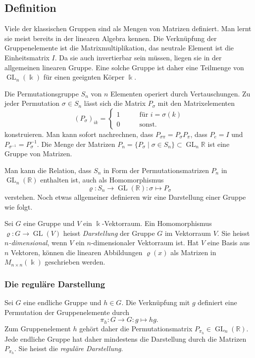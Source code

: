 %
%
%

%
%
\subsection{Definition}
Viele der klassischen Gruppen sind als Mengen von Matrizen definiert.
Man lernt sie meist bereits in der linearen Algebra kennen.
Die Verknüpfung der Gruppenelemente ist die Matrixmultiplikation,
das neutrale Element ist die Einheitsmatrix $I$.
Da sie auch invertierbar sein müssen, liegen sie in der 
allgemeinen linearen Gruppe.
Eine solche Gruppe ist daher eine Teilmenge von $\operatorname{GL}_n(\Bbbk)$
für einen geeignten Körper $\Bbbk$.

Die Permutationsgruppe $S_n$ von $n$ Elementen operiert durch 
Vertauschungen.
Zu jeder Permutation $\sigma\in S_n$ lässt sich die Matrix $P_\sigma$
mit den Matrixelementen
\[
(P_\sigma)_{ik}
=
\begin{cases}
1&\qquad\text{für $i=\sigma(k)$}\\
0&\qquad\text{sonst}.
\end{cases}
\]
konstruieren.
Man kann sofort nachrechnen, dass $P_{\sigma\pi} = P_\sigma P_\pi$,
dass $P_{e}=I$ und $P_{\sigma^{-1}}=P_\sigma^{-1}$.
Die Menge der Matrizen
$P_n=\{P_\sigma\mid\sigma\in S_n\}\subset\operatorname{GL}_n{\mathbb{R}}$
ist eine Gruppe von Matrizen.

Man kann die Relation, dass $S_n$ in Form der Permutationsmatrizen $P_n$
in $\operatorname{GL}_n(\mathbb{R})$ enthalten ist, auch als Homomorphismus
\[
\varrho
\colon 
S_n
\to
\operatorname{GL}(\mathbb{R})
:
\sigma
\mapsto
P_\sigma
\]
verstehen.
Noch etwas allgemeiner definieren wir eine Darstellung einer Gruppe
wie folgt.

\begin{definition}
Sei $G$ eine Gruppe und $V$ ein $\Bbbk$-Vektorraum.
Ein Homomorphismus $\varrho\colon G\to\operatorname{GL}(V)$
heisst {\em Darstellung} der Gruppe $G$ im Vektorraum $V$.
Sie heisst {\em $n$-dimensional}, wenn $V$ ein $n$-dimensionaler
Vektorraum ist.
Hat $V$ eine Basis aus $n$ Vektoren, können die linearen
Abbildungen $\varrho(x)$ als Matrizen in $M_{n\times n}(\Bbbk)$
geschrieben werden.
\end{definition}

%
%
\subsubsection{Die reguläre Darstellung}
Sei $G$ eine endliche Gruppe und $h\in G$.
Die Verknüpfung mit $g$ definiert eine Permutation der Gruppenelemente
durch
\[
\pi_h \colon G \to G : g \mapsto hg.
\]
Zum Gruppenelement $h$ gehört daher die Permutationsmatrix
$P_{\pi_h}\in\operatorname{GL}_n(\mathbb{R})$.
Jede endliche Gruppe hat daher mindestens die Darstellung durch die
Matrizen $P_{\pi_h}$.
Sie heisst die {\em reguläre Darstellung}.

